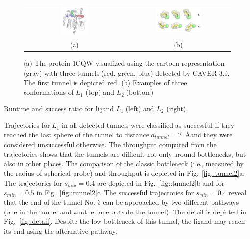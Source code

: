 \documentclass[letterpaper, 10 pt, conference]{ieeeconf} %
\def\dt{d_{tunnel}}
\def\smin{s_{min}}
\def\LA{L_1}
\def\LB{L_2}
\begin{document}
\begin{figure}
\centering
\begin{tabular}{cc}
\includegraphics[width=0.3\textwidth]{fig/t05proteintunnels} &
\includegraphics[width=0.45\textwidth]{fig/ligAll}  \\
(a) & (b)                        
\end{tabular}                       
\caption{\label{fig::tunnel}
    (a) The protein 1CQW visualized using the cartoon representation (gray) with 
        three tunnels (red, green, blue) detected by CAVER 3.0.
        The first tunnel is depicted red.
    (b) Examples of three conformations of $\LA$ (top) and $\LB$ (bottom)
}
\end{figure}



\begin{table}
\centering
\caption{\label{tab::rrt}
    Runtime and success ratio for ligand $\LA$ (left) and $\LB$ (right).
}
{
\small
\renewcommand{\tabcolsep}{1pt}

\hskip 4pt   

}
\end{table}





Trajectories for $\LA$ in all detected tunnels were classified as successful if they reached the last sphere of the tunnel
to distance $\dt=2$~\AA and they were considered unsuccessful otherwise.
The throughput computed from the trajectories shows that the tunnels are difficult not only around bottlenecks, but
also in other places.
The comparison of the classic bottleneck (i.e., measured by the radius of spherical probe) and throughput is depicted in Fig.~\ref{fig::tunnel2}a.
The trajectories for $\smin=0.4$ are depicted in Fig.~\ref{fig::tunnel2}b and for $\smin=0.5$ in Fig.~\ref{fig::tunnel2}c.
The successful trajectories for $\smin=0.4$ reveal that the end of the tunnel No. 3 can be approached by two different pathways (one in the tunnel and another one outside the tunnel).
The detail is depicted in Fig.~\ref{fig::detail}.
Despite the low bottleneck of this tunnel, the ligand may reach its end using the alternative pathway. 
\end{document}
